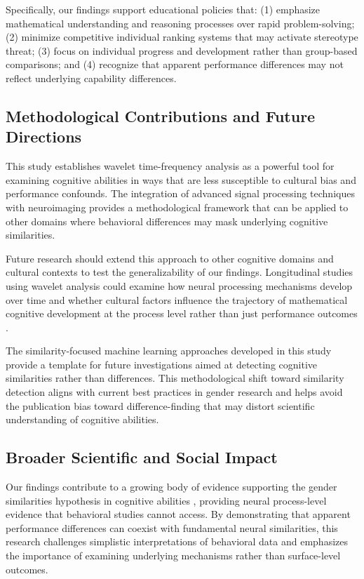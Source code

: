\documentclass[pdflatex,reference]{sn-jnl}%
\theoremstyle{thmstyleone}%
\theoremstyle{thmstyletwo}%
\theoremstyle{thmstylethree}%
\begin{document}
Specifically, our findings support educational policies that: (1) emphasize mathematical understanding and reasoning processes over rapid problem-solving; (2) minimize competitive individual ranking systems that may activate stereotype threat; (3) focus on individual progress and development rather than group-based comparisons; and (4) recognize that apparent performance differences may not reflect underlying capability differences.


\subsection{Methodological Contributions and Future Directions}
This study establishes wavelet time-frequency analysis as a powerful tool for examining cognitive abilities in ways that are less susceptible to cultural bias and performance confounds. The integration of advanced signal processing techniques with neuroimaging provides a methodological framework that can be applied to other domains where behavioral differences may mask underlying cognitive similarities.

Future research should extend this approach to other cognitive domains and cultural contexts to test the generalizability of our findings. Longitudinal studies using wavelet analysis could examine how neural processing mechanisms develop over time and whether cultural factors influence the trajectory of mathematical cognitive development at the process level rather than just performance outcomes \cite{grabner2013individual}.

The similarity-focused machine learning approaches developed in this study provide a template for future investigations aimed at detecting cognitive similarities rather than differences. This methodological shift toward similarity detection aligns with current best practices in gender research and helps avoid the publication bias toward difference-finding that may distort scientific understanding of cognitive abilities.


\subsection{Broader Scientific and Social Impact}
Our findings contribute to a growing body of evidence supporting the gender similarities hypothesis in cognitive abilities \cite{hyde2005gender,lindberg2010new}, providing neural process-level evidence that behavioral studies cannot access. By demonstrating that apparent performance differences can coexist with fundamental neural similarities, this research challenges simplistic interpretations of behavioral data and emphasizes the importance of examining underlying mechanisms rather than surface-level outcomes.
\end{document}
